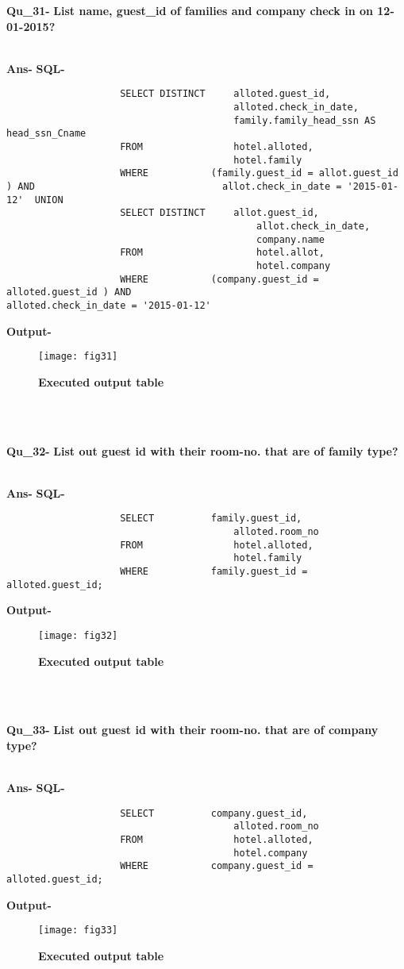 \documentclass[a4,12pt]{report}
\begin{document}
\textbf{Qu\_31-}  \textbf{List name, guest\_id of families and company check in on 12-01-2015?} \\\

\textbf{Ans-}		\textbf{SQL-}
\begin{lstlisting}
					SELECT DISTINCT		alloted.guest_id, 
  		  								alloted.check_in_date, 
 		  								family.family_head_ssn AS head_ssn_Cname
					FROM 				hotel.alloted, 
  										hotel.family
					WHERE 			(family.guest_id = allot.guest_id ) AND  								allot.check_in_date = '2015-01-12' 	UNION
					SELECT DISTINCT  	allot.guest_id, 
		  									allot.check_in_date, 
 		 									company.name
					FROM 					hotel.allot, 
		 	 								hotel.company
					WHERE 			(company.guest_id = alloted.guest_id ) AND  								alloted.check_in_date = '2015-01-12'
\end{lstlisting}
\textbf{Output-} \\			   
\begin{figure}[hbtp]
\centering
\texttt{[image: fig31]}
\caption{\textbf{{\color{red}Executed output table}}}
\end{figure}
\\\

\textbf{Qu\_32-}  \textbf{List out guest id with their room-no. that are of family type?} \\\

\textbf{Ans-}		\textbf{SQL-}
\begin{lstlisting}
					SELECT 		 	family.guest_id, 
 		  								alloted.room_no
					FROM 				hotel.alloted, 
		  								hotel.family
					WHERE 			family.guest_id = alloted.guest_id;
\end{lstlisting}
\textbf{Output-} \\			   
\begin{figure}[hbtp]
\centering
\texttt{[image: fig32]}
\caption{\textbf{{\color{red}Executed output table}}}
\end{figure}
\\\

\textbf{Qu\_33-}  \textbf{List out guest id with their room-no. that are of company type?} \\\

\textbf{Ans-}		\textbf{SQL-}
\begin{lstlisting}
					SELECT 		 	company.guest_id, 
 		  								alloted.room_no
					FROM 				hotel.alloted, 
		  								hotel.company
					WHERE 			company.guest_id = alloted.guest_id;
\end{lstlisting}
\textbf{Output-} \\			   
\begin{figure}[hbtp]
\centering
\texttt{[image: fig33]}
\caption{\textbf{{\color{red}Executed output table}}}
\end{figure}
\\\
\end{document}
